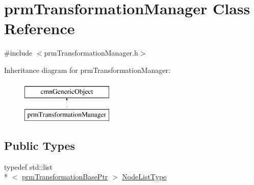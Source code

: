 \hypertarget{classprm_transformation_manager}{\section{prm\-Transformation\-Manager Class Reference}
\label{classprm_transformation_manager}
}


{\ttfamily \#include $<$prm\-Transformation\-Manager.\-h$>$}

Inheritance diagram for prm\-Transformation\-Manager\-:\begin{figure}[H]
\begin{center}
\leavevmode
\includegraphics[height=2.000000cm]{d9/d5b/classprm_transformation_manager}
\end{center}
\end{figure}
\subsection*{Public Types}
\begin{DoxyCompactItemize}
\item 
typedef std\-::list\\*
$<$ \hyperlink{prm_transformation_base_8h_a881a6a7d2191474974cdf36d79e1df08}{prm\-Transformation\-Base\-Ptr} $>$ \hyperlink{classprm_transformation_manager_a7aaa30d4612656c91c80fc8ee8b96518}{Node\-List\-Type}
\end{DoxyCompactItemize}
